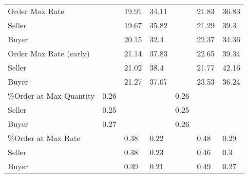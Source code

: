 \begin{tabular}{lllllll}
 Order Max Rate           &          & 19.91         & 34.11         &           & 21.83         & 36.83         \\
 Seller                   &          & 19.67         & 35.82         &           & 21.29         & 39.3          \\
 Buyer                    &          & 20.15         & 32.4          &           & 22.37         & 34.36         \\
 Order Max Rate (early)   &          & 21.14         & 37.83         &           & 22.65         & 39.34         \\
 Seller                   &          & 21.02         & 38.4          &           & 21.77         & 42.16         \\
 Buyer                    &          & 21.27         & 37.07         &           & 23.53         & 36.24         \\
 \%Order at Max Quantity   & 0.26     &               &               & 0.26      &               &               \\
 Seller                   & 0.25     &               &               & 0.25      &               &               \\
 Buyer                    & 0.27     &               &               & 0.26      &               &               \\
 \%Order at Max Rate       &          & 0.38          & 0.22          &           & 0.48          & 0.29          \\
 Seller                   &          & 0.38          & 0.23          &           & 0.46          & 0.3           \\
 Buyer                    &          & 0.39          & 0.21          &           & 0.49          & 0.27          \\
\hline
\end{tabular}